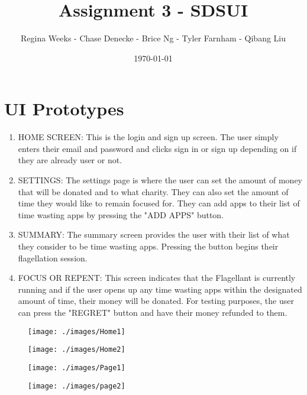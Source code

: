 \documentclass[a4paper]{article}
\title{Assignment 3 - SDSUI}
\author{Regina Weeks - Chase Denecke - Brice Ng - Tyler Farnham - Qibang Liu}
\date{\today}
\begin{document}
\maketitle

\section{UI Prototypes}
	\begin{enumerate}
    	\item HOME SCREEN: This is the login and sign up screen. The user simply enters their email and password and clicks sign in or sign up depending on if they are already user or not.

		\item SETTINGS: The settings page is where the user can set the amount of money that will be donated and to what charity. They can also set the amount of time they would like to remain focused for. They can add apps to their list of time wasting apps by pressing the "ADD APPS" button.

		\item SUMMARY: The summary screen provides the user with their list of what they consider to be time wasting apps. Pressing the button begins their flagellation session.

		\item FOCUS OR REPENT: This screen indicates that the Flagellant is currently running and if the user opens up any time wasting apps within the designated amount of time, their money will be donated. For testing purposes, the user can press the "REGRET" button and have their money refunded to them.
	\end{enumerate}
    
    
\begin{figure}[H]
	\centering
	\texttt{[image: ./images/Home1]}
\end{figure}

\begin{figure}[H]
	\centering
	\texttt{[image: ./images/Home2]}
\end{figure}

\begin{figure}[H]
	\centering
	\texttt{[image: ./images/Page1]}
\end{figure}

\begin{figure}[H]
	\centering
	\texttt{[image: ./images/page2]}
\end{figure}
\end{document}
